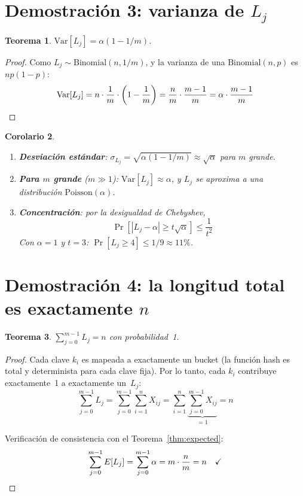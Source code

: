 \documentclass[11pt, letterpaper]{article}
\theoremstyle{definition}
\theoremstyle{plain}
\newtheorem{theorem}{Teorema}[section]
\newtheorem{corollary}[theorem]{Corolario}
\theoremstyle{remark}
\begin{document}
\section{Demostración 3: varianza de $L_j$}

\begin{theorem}\label{thm:variance}
$\mathrm{Var}[L_j] = \alpha(1 - 1/m)$.
\end{theorem}

\begin{proof}
Como $L_j \sim \mathrm{Binomial}(n, 1/m)$, y la varianza de una
$\mathrm{Binomial}(n, p)$ es $np(1{-}p)$:
\[
  \mathrm{Var}[L_j]
  = n \cdot \frac{1}{m} \cdot \left(1 - \frac{1}{m}\right)
  = \frac{n}{m} \cdot \frac{m-1}{m}
  = \alpha \cdot \frac{m-1}{m} \qedhere
\]
\end{proof}

\begin{corollary}\mbox{}
\begin{enumerate}
  \item \textbf{Desviación estándar}:
    $\sigma_{L_j} = \sqrt{\alpha(1 - 1/m)} \approx \sqrt{\alpha}$
    para $m$ grande.
  \item \textbf{Para $m$ grande} ($m \gg 1$):
    $\mathrm{Var}[L_j] \approx \alpha$, y $L_j$ se aproxima a una
    distribución $\mathrm{Poisson}(\alpha)$.
  \item \textbf{Concentración}: por la desigualdad de Chebyshev,
    \[
      \Pr\!\left[|L_j - \alpha| \geq t\sqrt{\alpha}\right]
      \leq \frac{1}{t^2}
    \]
    Con $\alpha = 1$ y $t = 3$:
    $\Pr[L_j \geq 4] \leq 1/9 \approx 11\%$.
\end{enumerate}
\end{corollary}

\section{Demostración 4: la longitud total es exactamente $n$}

\begin{theorem}\label{thm:total}
$\displaystyle\sum_{j=0}^{m-1} L_j = n$ con probabilidad~1.
\end{theorem}

\begin{proof}
Cada clave $k_i$ es mapeada a exactamente un bucket (la función hash
es total y determinista para cada clave fija). Por lo tanto, cada
$k_i$ contribuye exactamente~1 a exactamente un~$L_j$:
\[
  \sum_{j=0}^{m-1} L_j
  = \sum_{j=0}^{m-1} \sum_{i=1}^{n} X_{ij}
  = \sum_{i=1}^{n} \underbrace{\sum_{j=0}^{m-1} X_{ij}}_{= 1}
  = n
\]

Verificación de consistencia con el Teorema~\ref{thm:expected}:
\[
  \sum_{j=0}^{m-1} E[L_j]
  = \sum_{j=0}^{m-1} \alpha
  = m \cdot \frac{n}{m} = n \quad \checkmark \qedhere
\]
\end{proof}
\end{document}
